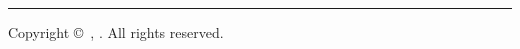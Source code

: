 %
%
%
\begin{titlepage}
    \raggedleft
    \hfill
    \vfill
    {\parbox[b]{0.8\textwidth}{\raggedleft\LARGE\textsc{\thetitle}}\par}
    \rule{\textwidth}{.4pt}\par
    {\Large\textsc{\theauthor}\par}
    \vspace{5em}
    {\large\itshape\degree\par}
    \vspace{0.5em}
    {\large\itshape\university\par}
    \vfill
    \makeatletter
    \centering
    {\large\@dtm@ini@year\par}
    \vspace{0.5em}
    Copyright \copyright\ \theauthor, \@dtm@ini@year.
    All rights reserved.
    \makeatother
\end{titlepage}
